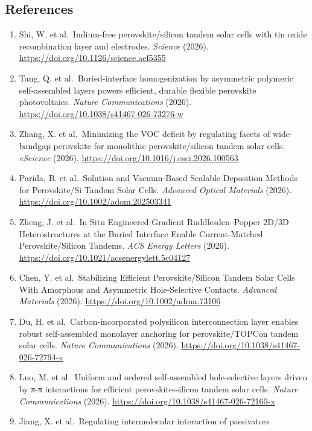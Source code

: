 \documentclass[
  11pt,
]{article}
\providecommand{\tightlist}{%
  \setlength{\itemsep}{0pt}\setlength{\parskip}{0pt}}
\begin{document}
\subsection{References}\label{references}

\begin{enumerate}
\def\labelenumi{\arabic{enumi}.}
\tightlist
\item
  Shi, W. et al.~Indium-free perovskite/silicon tandem solar cells with
  tin oxide recombination layer and electrodes. \emph{Science} (2026).
  \url{https://doi.org/10.1126/science.aef5355}
\item
  Tang, Q. et al.~Buried-interface homogenization by asymmetric
  polymeric self-assembled layers powers efficient, durable flexible
  perovskite photovoltaics. \emph{Nature Communications} (2026).
  \url{https://doi.org/10.1038/s41467-026-73276-w}
\item
  Zhang, X. et al.~Minimizing the VOC deficit by regulating facets of
  wide-bandgap perovskite for monolithic perovskite/silicon tandem solar
  cells. \emph{eScience} (2026).
  \url{https://doi.org/10.1016/j.esci.2026.100563}
\item
  Parida, B. et al.~Solution and Vacuum‐Based Scalable Deposition
  Methods for Perovskite/Si Tandem Solar Cells. \emph{Advanced Optical
  Materials} (2026). \url{https://doi.org/10.1002/adom.202503341}
\item
  Zheng, J. et al.~In Situ Engineered Gradient Ruddlesden--Popper 2D/3D
  Heterostructures at the Buried Interface Enable Current-Matched
  Perovskite/Silicon Tandems. \emph{ACS Energy Letters} (2026).
  \url{https://doi.org/10.1021/acsenergylett.5c04127}
\item
  Chen, Y. et al.~Stabilizing Efficient Perovskite/Silicon Tandem Solar
  Cells With Amorphous and Asymmetric Hole‐Selective Contacts.
  \emph{Advanced Materials} (2026).
  \url{https://doi.org/10.1002/adma.73106}
\item
  Du, H. et al.~Carbon-incorporated polysilicon interconnection layer
  enables robust self-assembled monolayer anchoring for
  perovskite/TOPCon tandem solar cells. \emph{Nature Communications}
  (2026). \url{https://doi.org/10.1038/s41467-026-72794-x}
\item
  Luo, M. et al.~Uniform and ordered self-assembled hole-selective
  layers driven by π-π interactions for efficient perovskite-silicon
  tandem solar cells. \emph{Nature Communications} (2026).
  \url{https://doi.org/10.1038/s41467-026-72160-x}
\item
  Jiang, X. et al.~Regulating intermolecular interaction of passivators

\end{enumerate}
\end{document}
